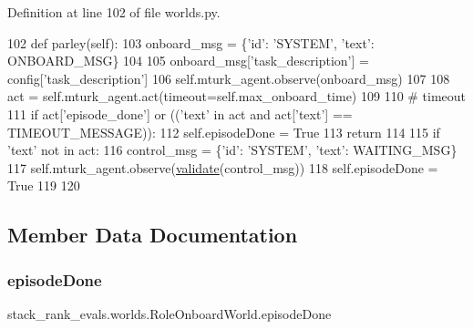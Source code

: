 Definition at line 102 of file worlds.\+py.


\begin{DoxyCode}
102     \textcolor{keyword}{def }parley(self):
103         onboard\_msg = \{\textcolor{stringliteral}{'id'}: \textcolor{stringliteral}{'SYSTEM'}, \textcolor{stringliteral}{'text'}: ONBOARD\_MSG\}
104 
105         onboard\_msg[\textcolor{stringliteral}{'task\_description'}] = config[\textcolor{stringliteral}{'task\_description'}]
106         self.mturk\_agent.observe(onboard\_msg)
107 
108         act = self.mturk\_agent.act(timeout=self.max\_onboard\_time)
109 
110         \textcolor{comment}{# timeout}
111         \textcolor{keywordflow}{if} act[\textcolor{stringliteral}{'episode\_done'}] \textcolor{keywordflow}{or} ((\textcolor{stringliteral}{'text'} \textcolor{keywordflow}{in} act \textcolor{keywordflow}{and} act[\textcolor{stringliteral}{'text'}] == TIMEOUT\_MESSAGE)):
112             self.episodeDone = \textcolor{keyword}{True}
113             \textcolor{keywordflow}{return}
114 
115         \textcolor{keywordflow}{if} \textcolor{stringliteral}{'text'} \textcolor{keywordflow}{not} \textcolor{keywordflow}{in} act:
116             control\_msg = \{\textcolor{stringliteral}{'id'}: \textcolor{stringliteral}{'SYSTEM'}, \textcolor{stringliteral}{'text'}: WAITING\_MSG\}
117             self.mturk\_agent.observe(\hyperlink{namespaceparlai_1_1core_1_1worlds_afc3fad603b7bce41dbdc9cdc04a9c794}{validate}(control\_msg))
118             self.episodeDone = \textcolor{keyword}{True}
119 
120 
\end{DoxyCode}


\subsection{Member Data Documentation}
\mbox{\label{classstack__rank__evals_1_1worlds_1_1RoleOnboardWorld_a80faeeeacacbf4babca6b7a66d6716bd}} 
\subsubsection{\texorpdfstring{episode\+Done}{episodeDone}}
{\footnotesize\ttfamily stack\+\_\+rank\+\_\+evals.\+worlds.\+Role\+Onboard\+World.\+episode\+Done}



